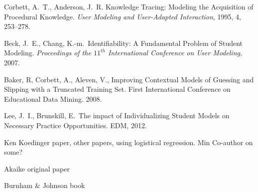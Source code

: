 \documentclass[11pt,letterpaper]{article}
\begin{document}
\begin{thebibliography}{9}

  Corbett, A.\ T., Anderson, J.\ R. Knowledge Tracing:  Modeling 
the Acquisition of Procedural Knowledge.  \emph{User Modeling and
 User-Adapted Interaction}, 1995, 4, 253--278.

  Beck, J.\ E., Chang, K.-m.\ Identifiability: A Fundamental Problem of
  Student Modeling.
  \emph{Proceedings of the $11^{th}$ International Conference on User 
    Modeling}, 2007.

 Baker, R, Corbett, A., Aleven, V.,  Improving Contextual 
    Models of Guessing and Slipping with a Truncated Training Set. 
    First International Conference on Educational Data Mining. 2008. 

   Lee, J.\ I., Brunskill, E.\ The impact of Individualizing Student 
  Models on Necessary Practice Opportunities.  EDM, 2012.

  Ken Koedinger paper, other papers, using logistical regression.
  Min Co-author on some?

   Akaike original paper

   Burnham \& Johnson book

\end{thebibliography}
\end{document}
